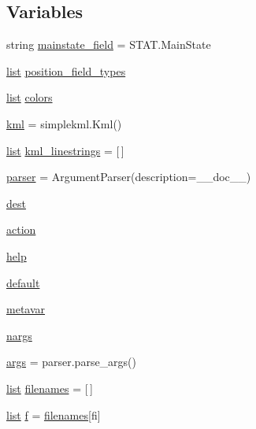 \subsection*{Variables}
\begin{DoxyCompactItemize}
\item 
string \mbox{\hyperlink{namespacepymavlink_1_1tools_1_1mavkml_aad726a3ac909c018fb1303b9d05eb634}{mainstate\+\_\+field}} = \textquotesingle{}S\+T\+A\+T.\+Main\+State\textquotesingle{}
\item 
\mbox{\hyperlink{structlist}{list}} \mbox{\hyperlink{namespacepymavlink_1_1tools_1_1mavkml_a1b6364cf6f6e383862ef5bb27ca7fedf}{position\+\_\+field\+\_\+types}}
\item 
\mbox{\hyperlink{structlist}{list}} \mbox{\hyperlink{namespacepymavlink_1_1tools_1_1mavkml_ab297c6177e8f218c288309ff24bacbac}{colors}}
\item 
\mbox{\hyperlink{namespacepymavlink_1_1tools_1_1mavkml_a00647bf0ef524ff39f244060515b7da1}{kml}} = simplekml.\+Kml()
\item 
\mbox{\hyperlink{structlist}{list}} \mbox{\hyperlink{namespacepymavlink_1_1tools_1_1mavkml_ae3061f22c947980910bd196d0d00ba18}{kml\+\_\+linestrings}} = \mbox{[}$\,$\mbox{]}
\item 
\mbox{\hyperlink{namespacepymavlink_1_1tools_1_1mavkml_a1a6f129dd1833552809a583a1739738c}{parser}} = Argument\+Parser(description=\+\_\+\+\_\+doc\+\_\+\+\_\+)
\item 
\mbox{\hyperlink{namespacepymavlink_1_1tools_1_1mavkml_ae2719bf1d17db1e9d15924fc8cdf8c46}{dest}}
\item 
\mbox{\hyperlink{namespacepymavlink_1_1tools_1_1mavkml_ad9aae12df2537904d826fbe65008f651}{action}}
\item 
\mbox{\hyperlink{namespacepymavlink_1_1tools_1_1mavkml_a2a16af23b63e78e5ce1444915a6406c6}{help}}
\item 
\mbox{\hyperlink{namespacepymavlink_1_1tools_1_1mavkml_aab389ebfae522a257242459ae7ce5bf2}{default}}
\item 
\mbox{\hyperlink{namespacepymavlink_1_1tools_1_1mavkml_a986f261d0f729c9b21cef5beeb13ae3d}{metavar}}
\item 
\mbox{\hyperlink{namespacepymavlink_1_1tools_1_1mavkml_ab8cf8bbb2f7cdfaf6fc4de2ea7136254}{nargs}}
\item 
\mbox{\hyperlink{namespacepymavlink_1_1tools_1_1mavkml_aed6f203ddb846d8e9662684b3f62f48c}{args}} = parser.\+parse\+\_\+args()
\item 
\mbox{\hyperlink{structlist}{list}} \mbox{\hyperlink{namespacepymavlink_1_1tools_1_1mavkml_a84b6c0ac258ed15dfc8caa95c770475c}{filenames}} = \mbox{[}$\,$\mbox{]}
\item 
\mbox{\hyperlink{structlist}{list}} \mbox{\hyperlink{namespacepymavlink_1_1tools_1_1mavkml_a66015ffc8eb20197077dd017941da065}{f}} = \mbox{\hyperlink{namespacepymavlink_1_1tools_1_1mavkml_a84b6c0ac258ed15dfc8caa95c770475c}{filenames}}\mbox{[}fi\mbox{]}
\end{DoxyCompactItemize}


